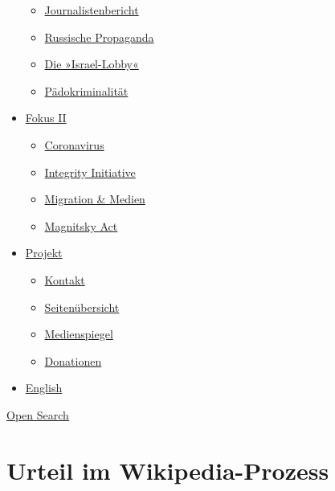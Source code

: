 \begin{itemize}
  \begin{itemize}
  \tightlist
  \item
    \href{https://swprs.org/bericht-eines-journalisten/}{Journalistenbericht}
  \item
    \href{https://swprs.org/russische-propaganda/}{Russische Propaganda}
  \item
    \href{https://swprs.org/die-israel-lobby-fakten-und-mythen/}{Die
    »Israel-Lobby«}
  \item
    \href{https://swprs.org/geopolitik-und-paedokriminalitaet/}{Pädokriminalität}
  \end{itemize}
\item
  \href{https://swprs.org/migration-und-medien/}{Fokus II}

  \begin{itemize}
  \tightlist
  \item
    \href{https://swprs.org/covid-19-hinweis-ii/}{Coronavirus}
  \item
    \href{https://swprs.org/die-integrity-initiative/}{Integrity
    Initiative}
  \item
    \href{https://swprs.org/migration-und-medien/}{Migration \& Medien}
  \item
    \href{https://swprs.org/der-fall-magnitsky/}{Magnitsky Act}
  \end{itemize}
\item
  \href{https://swprs.org/kontakt/}{Projekt}

  \begin{itemize}
  \tightlist
  \item
    \href{https://swprs.org/kontakt/}{Kontakt}
  \item
    \href{https://swprs.org/uebersicht/}{Seitenübersicht}
  \item
    \href{https://swprs.org/medienspiegel/}{Medienspiegel}
  \item
    \href{https://swprs.org/donationen/}{Donationen}
  \end{itemize}
\item
  \href{https://swprs.org/contact/}{English}
\end{itemize}

\protect\hyperlink{}{Open Search}

\hypertarget{urteil-im-wikipedia-prozess}{%
\section{Urteil im
Wikipedia-Prozess}\label{urteil-im-wikipedia-prozess}}

